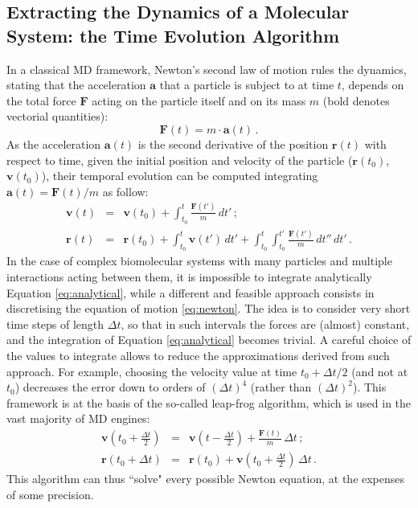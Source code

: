 \documentclass[graybox]{svmult}
\begin{document}
\subsection{Extracting the Dynamics of a Molecular System: the Time Evolution Algorithm}
In a classical MD framework, Newton's second law of motion rules the dynamics, stating that the acceleration $\textbf{a}$ that a particle is subject to at time $t$, depends on the total force $\textbf{F}$ acting on the particle itself and on its mass $m$ (bold denotes vectorial quantities):
\begin{equation} \label{eq:newton}
\textbf{F}(t) =  m \cdot \textbf{a}(t) \, .
\end{equation}
As the acceleration $\textbf{a}(t)$ is the second derivative of the position $\textbf{r}(t)$ with respect to time, given the initial position and velocity of the particle ($\textbf{r}(t_0)$, $\textbf{v}(t_0)$), their temporal evolution can be computed integrating $\textbf{a}(t) = \textbf{F}(t)/m$ as follow:
\begin{eqnarray} \label{eq:analytical}
\mathbf{v}(t) &=& \mathbf{v}(t_0) + \int_{t_0}^t \frac{\mathbf{F}(t')}{m} \, dt' \, ; \\
\mathbf{r}(t) &=& \mathbf{r}(t_0) + \int_{t_0}^t \mathbf{v}(t') \, dt' + \int_{t_0}^t \int_{t_0}^{t'} \frac{\mathbf{F}(t')}{m} \, dt'' \, dt'\, .
\end{eqnarray}
In the case of complex biomolecular systems with many particles and multiple interactions acting between them, it is impossible to integrate analytically Equation \ref{eq:analytical}, while a different and feasible approach consists in discretising the equation of motion \ref{eq:newton}.
%
The idea is to consider very short time steps of length $\Delta t$, so that in such intervals the forces are (almost) constant, and the integration of Equation \ref{eq:analytical} becomes trivial.
%
A careful choice of the values to integrate allows to reduce the approximations derived from such approach.
For example, choosing the velocity value at time $t_0 + \Delta t/2$ (and not at $t_0$) decreases the error down to orders of $(\Delta t)^4$ (rather than $(\Delta t)^2$). This framework is at the basis of the so-called leap-frog algorithm, which is used in the vast majority of MD engines:
\begin{eqnarray}
\mathbf{v}\left(t_0 + \frac{\Delta t}{2}\right) &=& \mathbf{v}\left(t - \frac{\Delta t}{2}\right) + \frac{\mathbf{F}(t)}{m} \, \Delta t \, ; \\
\mathbf{r}(t_0 + \Delta t) &=& \mathbf{r}(t_0) + \mathbf{v}\left(t_0 + \frac{\Delta t}{2}\right) \, \Delta t \, .
\end{eqnarray}
This algorithm can thus ``solve" every possible Newton equation, at the expenses of some precision.
\end{document}
